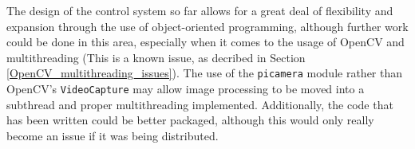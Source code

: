 \documentclass[11pt]{article}
\begin{document}
The design of the control system so far allows for a great deal of flexibility and expansion through the use of object-oriented programming, although further work could be done in this area, especially when it comes to the usage of OpenCV and multithreading (This is a known issue, as decribed in Section \ref{OpenCV_multithreading_issues}). The use of the \lstinline|picamera| module rather than OpenCV's \lstinline|VideoCapture| may allow image processing to be moved into a subthread and proper multithreading implemented. Additionally, the code that has been written could be better packaged, although this would only really become an issue if it was being distributed.




\newpage
\appendix
\end{document}
